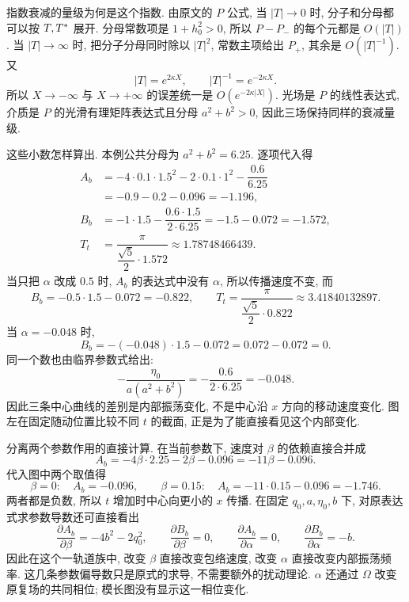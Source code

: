 \par\smallskip\noindent 指数衰减的量级为何是这个指数.\quad
由原文的 $P$ 公式, 当 $|T|\to0$ 时, 分子和分母都可以按 $T,{T}^{*}$ 展开. 分母常数项是 $1+h_0^2>0$, 所以 $P-P_-$ 的每个元都是 $O(|T|)$. 当 $|T|\to\infty$ 时, 把分子分母同时除以 $|T|^2$, 常数主项给出 $P_+$, 其余是 $O(|T|^{-1})$. 又
\begin{equation*}
|T|=e^{2\kappa X},\qquad
|T|^{-1}=e^{-2\kappa X}.
\end{equation*}
所以 $X\to-\infty$ 与 $X\to+\infty$ 的误差统一是 $O(e^{-2\kappa|X|})$. 光场是 $P$ 的线性表达式, 介质是 $P$ 的光滑有理矩阵表达式且分母 $a^2+b^2>0$, 因此三场保持同样的衰减量级.


\par\smallskip\noindent 这些小数怎样算出.\quad
本例公共分母为 $a^2+b^2=6.25$. 逐项代入得
\begin{align*}
A_b&=-4\cdot0.1\cdot1.5^2-2\cdot0.1\cdot1^2-\dfrac{0.6}{6.25}\\
&=-0.9-0.2-0.096=-1.196,\\
B_b&=-1\cdot1.5-\dfrac{0.6\cdot1.5}{2\cdot6.25}
=-1.5-0.072=-1.572,\\
T_t&=\dfrac{\pi}{\dfrac{\sqrt{5}}{2}\cdot1.572}
\approx1.78748466439.
\end{align*}
当只把 $\alpha$ 改成 $0.5$ 时, $A_b$ 的表达式中没有 $\alpha$, 所以传播速度不变, 而
\begin{equation*}
B_b=-0.5\cdot1.5-0.072=-0.822,\qquad
T_t=\dfrac{\pi}{\dfrac{\sqrt{5}}{2}\cdot0.822}
\approx3.41840132897.
\end{equation*}
当 $\alpha=-0.048$ 时,
\begin{equation*}
B_b=-(-0.048)\cdot1.5-0.072=0.072-0.072=0.
\end{equation*}
同一个数也由临界参数式给出:
\begin{equation*}
-\dfrac{\eta_0}{a(a^2+b^2)}=-\dfrac{0.6}{2\cdot6.25}=-0.048.
\end{equation*}
因此三条中心曲线的差别是内部振荡变化, 不是中心沿 $x$ 方向的移动速度变化. 图左在固定随动位置比较不同 $t$ 的截面, 正是为了能直接看见这个内部变化.

\par\smallskip\noindent 分离两个参数作用的直接计算.\quad
在当前参数下, 速度对 $\beta$ 的依赖直接合并成
\begin{equation*}
A_b=-4\beta\cdot2.25-2\beta-0.096=-11\beta-0.096.
\end{equation*}
代入图中两个取值得
\begin{equation*}
\beta=0:\quad A_b=-0.096,\qquad
\beta=0.15:\quad A_b=-11\cdot0.15-0.096=-1.746.
\end{equation*}
两者都是负数, 所以 $t$ 增加时中心向更小的 $x$ 传播. 在固定 $q_0,a,\eta_0,b$ 下, 对原表达式求参数导数还可直接看出
\begin{equation*}
\dfrac{\partial A_b}{\partial\beta}=-4b^2-2q_0^2,\qquad
\dfrac{\partial B_b}{\partial\beta}=0,\qquad
\dfrac{\partial A_b}{\partial\alpha}=0,\qquad
\dfrac{\partial B_b}{\partial\alpha}=-b.
\end{equation*}
因此在这个一轨道族中, 改变 $\beta$ 直接改变包络速度, 改变 $\alpha$ 直接改变内部振荡频率. 这几条参数偏导数只是原式的求导, 不需要额外的扰动理论. $\alpha$ 还通过 $\Omega$ 改变原复场的共同相位; 模长图没有显示这一相位变化.

